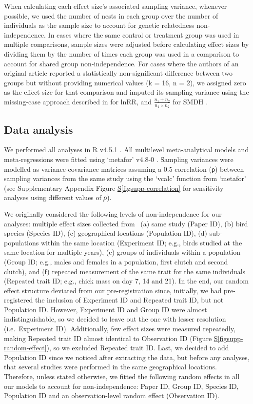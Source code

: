 \documentclass[
  number,
  review,
  onecolumn]{elsarticle}
\newcommand*\quartofigsuppref[1]{Figure \hyperref[#1]{S\ref{#1}}}
\begin{document}
When calculating each effect size's associated sampling variance,
whenever possible, we used the number of nests in each group over the
number of individuals as the sample size to account for genetic
relatedness non-independence. In cases where the same control or
treatment group was used in multiple comparisons, sample sizes were
adjusted before calculating effect sizes by dividing them by the number
of times each group was used in a comparison to account for shared group
non-independence. For cases where the authors of an original article
reported a statistically non-significant difference between two groups
but without providing numerical values (k = 16, n = 2), we assigned zero
as the effect size for that comparison and imputed its sampling variance
using the missing-case approach described in \citep{nakagawa2022} for
lnRR, and \(\frac{n_1+n_2}{n_1×n_2}\) for SMDH \citep{lajeunesse2013}.

\subsection{Data analysis}\label{data-analysis}

We performed all analyses in R v4.5.1 \citep{R-version}. All multilevel
meta-analytical models and meta-regressions were fitted using `metafor'
v4.8-0 \citep{metafor}. Sampling variances were modelled as
variance-covariance matrices assuming a 0.5 correlation (ρ) between
sampling variances from the same study \citep{noble2017} using the
`vcalc' function from `metafor' (see Supplementary Appendix
\quartofigsuppref{figsupp-correlation} for sensitivity analyses using
different values of \emph{ρ}).

We originally considered the following levels of non-independence for
our analyses: multiple effect sizes collected from~ (a) same study
(Paper ID), (b) bird species (Species ID), (c) geographical locations
(Population ID), (d) sub-populations within the same location
(Experiment ID; e.g., birds studied at the same location for multiple
years), (e) groups of individuals within a population (Group ID; e.g.,
males and females in a population, first clutch and second clutch), and
(f) repeated measurement of the same trait for the same individuals
(Repeated trait ID; e.g., chick mass on day 7, 14 and 21). In the end,
our random effect structure deviated from our pre-registration since,
initially, we had pre-registered the inclusion of Experiment ID and
Repeated trait ID, but not Population ID. However, Experiment ID and
Group ID were almost indistinguishable, so we decided to leave out the
one with lesser resolution (i.e.~Experiment ID). Additionally, few
effect sizes were measured repeatedly, making Repeated trait ID almost
identical to Observation ID (\quartofigsuppref{figsupp-random-effect}),
so we excluded Repeated trait ID. Last, we decided to add Population ID
since we noticed after extracting the data, but before any analyses,
that several studies were performed in the same geographical locations.
Therefore, unless stated otherwise, we fitted the following random
effects in all our models to account for non-independence: Paper ID,
Group ID, Species ID, Population ID and an observation-level random
effect (Observation ID).
\end{document}
